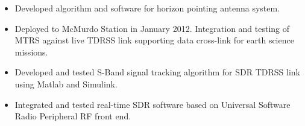     \begin{itemize}
        \item Developed algorithm and software for horizon pointing antenna system.
        \item Deployed to McMurdo Station in January 2012. Integration and testing of MTRS against live TDRSS link supporting data cross-link for earth science missions.
    \end{itemize}

    \begin{itemize}
        \item Developed and tested S-Band signal tracking algorithm for SDR TDRSS link using Matlab and Simulink.
        \item Integrated and tested real-time SDR software based on Universal Software Radio Peripheral RF front end.
    \end{itemize}
\EndJob

\EndJob
